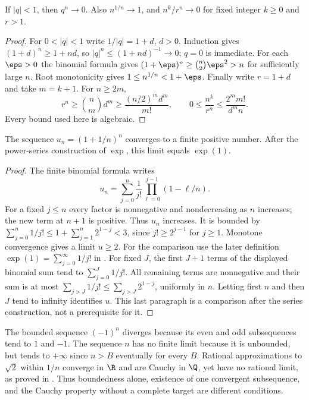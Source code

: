 \begin{example}
If $|q|<1$, then $q^n\to0$. Also $n^{1/n}\to1$, and $n^k/r^n\to0$ for fixed integer $k\ge0$ and $r>1$.
\end{example}
\begin{proof}
For $0<|q|<1$ write $1/|q|=1+d$, $d>0$. Induction gives $(1+d)^n\ge1+nd$, so $|q|^n\le(1+nd)^{-1}\to0$; $q=0$ is immediate. For each $\eps>0$ the binomial formula gives $(1+\eps)^n\ge\binom n2\eps^2>n$ for sufficiently large $n$. Root monotonicity gives $1\le n^{1/n}<1+\eps$. Finally write $r=1+d$ and take $m=k+1$. For $n\ge2m$,
\[ r^n\ge\binom nm d^m\ge \frac{(n/2)^m d^m}{m!},\qquad 0\le\frac{n^k}{r^n}\le\frac{2^m m!}{d^m n}. \]
Every bound used here is algebraic.
\end{proof}

\begin{construction}
The sequence $u_n=(1+1/n)^n$ converges to a finite positive number. After the power-series construction of $\exp$, this limit equals $\exp(1)$.
\end{construction}
\begin{proof}
The finite binomial formula writes
\[ u_n=\sum_{j=0}^n\frac1{j!}\prod_{\ell=0}^{j-1}(1-\ell/n). \]
For a fixed $j\le n$ every factor is nonnegative and nondecreasing as $n$ increases; the new term at $n+1$ is positive. Thus $u_n$ increases. It is bounded by $\sum_{j=0}^n1/j!\le 1+\sum_{j=1}^n2^{1-j}<3$, since $j!\ge2^{j-1}$ for $j\ge1$. Monotone convergence gives a limit $u\ge2$.
For the comparison use the later definition $\exp(1)=\sum_{j=0}^\infty1/j!$ in . For fixed $J$, the first $J+1$ terms of the displayed binomial sum tend to $\sum_{j=0}^J1/j!$. All remaining terms are nonnegative and their sum is at most $\sum_{j>J}1/j!\le\sum_{j>J}2^{1-j}$, uniformly in $n$. Letting first $n$ and then $J$ tend to infinity identifies $u$. This last paragraph is a comparison after the series construction, not a prerequisite for it.
\end{proof}

\begin{example}
The bounded sequence $(-1)^n$ diverges because its even and odd subsequences tend to $1$ and $-1$. The sequence $n$ has no finite limit because it is unbounded, but tends to $+\infty$ since $n>B$ eventually for every $B$. Rational approximations to $\sqrt2$ within $1/n$ converge in $\R$ and are Cauchy in $\Q$, yet have no rational limit, as proved in . Thus boundedness alone, existence of one convergent subsequence, and the Cauchy property without a complete target are different conditions.
\end{example}
